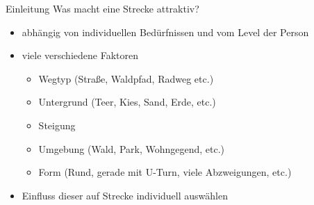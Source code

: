\documentclass[aspectratio=169,xcolor=dvipsnames, t]{beamer}
\begin{document}
	\begin{frame}{Einleitung}
		\vspace{0.25cm}
		Was macht eine Strecke attraktiv?\\
		\pause
		\vspace{-0.2cm}
		\begin{minipage}[t]{0.48\textwidth}
			\begin{itemize}[<+->]
				\item abhängig von individuellen Bedürfnissen und vom Level der Person
				\item viele verschiedene Faktoren
				\begin{itemize}[<+->]
					\item Wegtyp (Straße, Waldpfad, Radweg etc.)
					\item Untergrund (Teer, Kies, Sand, Erde, etc.)
					\item Steigung
					\item Umgebung (Wald, Park, Wohngegend, etc.)
					\item Form (Rund, gerade mit U-Turn, viele Abzweigungen, etc.)
				\end{itemize}
				\item Einfluss dieser auf Strecke individuell auswählen 
		\end{itemize}
		\end{minipage}
		\begin{minipage}[t][0.7\textheight][b]{0.48\textwidth}
\end{minipage}
\end{frame}
\end{document}

